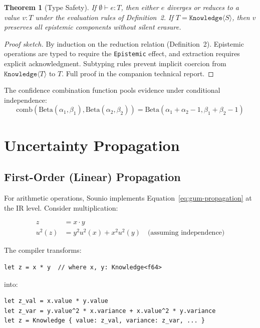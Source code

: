 \documentclass[11pt,a4paper]{article}
\newtheorem{theorem}{Theorem}
\begin{document}
\begin{theorem}[Type Safety]
If $\emptyset \vdash e : T$, then either $e$ diverges or reduces to a value
$v : T$ under the evaluation rules of Definition~2. If $T = \texttt{Knowledge}\langle S \rangle$, then $v$ preserves all
epistemic components without silent erasure.
\end{theorem}

\begin{proof}[Proof sketch]
By induction on the reduction relation (Definition~2). Epistemic operations
are typed to require the \texttt{Epistemic} effect, and extraction requires
explicit acknowledgment. Subtyping rules prevent implicit coercion from
$\texttt{Knowledge}\langle T \rangle$ to $T$. Full proof in the companion
technical report.
\end{proof}

The confidence combination function pools evidence under conditional independence:
\[
  \text{comb}(\text{Beta}(\alpha_1,\beta_1), \text{Beta}(\alpha_2,\beta_2)) = \text{Beta}(\alpha_1{+}\alpha_2{-}1, \beta_1{+}\beta_2{-}1)
\]

\section{Uncertainty Propagation}
\label{sec:propagation}

\subsection{First-Order (Linear) Propagation}

For arithmetic operations, Sounio implements Equation~\ref{eq:gum-propagation}
at the IR level. Consider multiplication:

\begin{align}
  z &= x \cdot y \\
  u^2(z) &= y^2 u^2(x) + x^2 u^2(y) \quad \text{(assuming independence)}
\end{align}

The compiler transforms:

\begin{lstlisting}
let z = x * y  // where x, y: Knowledge<f64>
\end{lstlisting}

into:

\begin{lstlisting}
let z_val = x.value * y.value
let z_var = y.value^2 * x.variance + x.value^2 * y.variance
let z = Knowledge { value: z_val, variance: z_var, ... }
\end{lstlisting}
\end{document}

